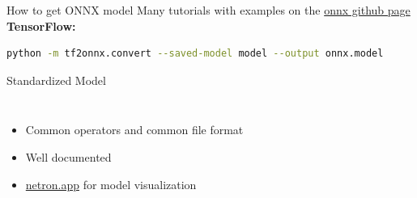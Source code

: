 \documentclass[aspectratio=169,9pt]{beamer}
\begin{document}
\begin{frame}[t,fragile]{How to get ONNX model}
  Many tutorials with examples on the \href{https://github.com/onnx/tutorials\#converting-to-onnx-format}{\color{blue}onnx github page}\\
  \vspace*{1em}
  \textbf{TensorFlow:}
  \begin{lstlisting}[language=bash]
    python -m tf2onnx.convert --saved-model model --output onnx.model
  \end{lstlisting}
\end{frame}


\begin{frame}[t]{Standardized Model}
  \begin{columns}[t]
      \begin{itemize}
        \item Common operators and common file format
        \item Well documented
        \item \href{https://netron.app/}{\color{blue}netron.app} for model visualization
      \end{itemize}
      \begin{figure}
        \vspace*{-1.5cm}
        \centering

\end{figure}
\end{columns}
\end{frame}
\end{document}
